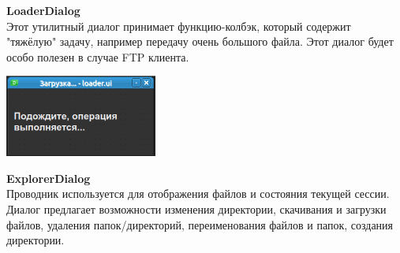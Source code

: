 \documentclass[a4paper,14pt]{extarticle}
\begin{document}
\textbf{LoaderDialog}\\
Этот утилитный диалог принимает функцию-колбэк, который содержит "тяжёлую" задачу, например 
передачу очень большого файла. Этот диалог будет особо полезен в случае FTP клиента.\\
\begin{center}
\includegraphics[width=50mm]{loader_dialog}
\end{center}

\textbf{ExplorerDialog}\\
Проводник используется для отображения файлов и состояния текущей сессии. 
Диалог предлагает возможности изменения директории, скачивания и загрузки файлов, 
удаления папок/директорий, переименования файлов и папок, создания директории.
\end{document}
